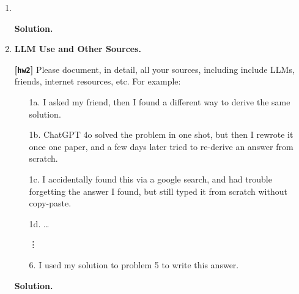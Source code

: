 \documentclass{article}
\def\R{\mathbb{R}}
\def\hw{\textbf{[\texttt{hw2}]}\xspace}
\theoremstyle{definition}
\theoremstyle{remark}
\newenvironment{Q}
{%
\clearpage
\item
}
{%
\phantom{s}%
\bigskip%
\noindent\textbf{Solution.}
}
\begin{document}
\begin{enumerate}[font={\Large\bfseries},leftmargin=0pt]
\begin{Q}
\begin{enumerate}


\end{enumerate}



\end{Q}


\clearpage

\begin{Q}
  \textbf{\Large LLM Use and Other Sources.}
    
    \hw Please document, in detail, all your sources, including include LLMs, friends,
    internet resources, etc.  For example:
    \begin{enumerate}
      \item[1a.] I asked my friend, then I found a different way to derive the same solution.
      \item[1b.] ChatGPT 4o solved the problem in one shot, but then I rewrote it once one
        paper, and a few days later tried to re-derive an answer from scratch.
      \item[1c.] I accidentally found this via a google search,
        and had trouble forgetting the answer I found, but still typed it from scratch
        without copy-paste.
      \item[1d.] \dots
      \item[\vdots] 
      \item[6.] I used my solution to problem 5 to write this answer.
    \end{enumerate}
    
\end{Q}

\end{enumerate}


%    
\end{document}
